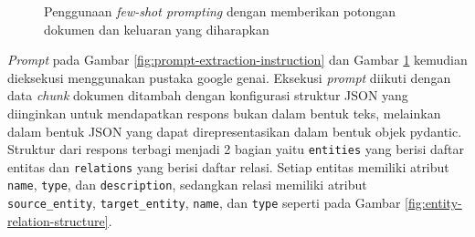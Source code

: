 \begin{figure}[H]
	\centering
	\caption{
		Penggunaan \textit{few-shot prompting} dengan memberikan potongan dokumen dan keluaran yang diharapkan
	}
	\label{fig:prompt-extraction-few-shot}
\end{figure}

\textit{Prompt} pada Gambar \ref{fig:prompt-extraction-instruction} dan Gambar \ref{fig:prompt-extraction-few-shot} kemudian dieksekusi menggunakan pustaka google genai.
Eksekusi \textit{prompt} diikuti dengan data \textit{chunk} dokumen ditambah dengan konfigurasi struktur JSON yang diinginkan untuk mendapatkan respons bukan dalam bentuk teks, melainkan dalam bentuk JSON yang dapat direpresentasikan dalam bentuk objek pydantic.
Struktur dari respons terbagi menjadi 2 bagian yaitu \texttt{entities} yang berisi daftar entitas dan \texttt{relations} yang berisi daftar relasi.
Setiap entitas memiliki atribut \texttt{name}, \texttt{type}, dan \texttt{description}, sedangkan relasi memiliki atribut \\
\texttt{source\_entity}, \texttt{target\_entity}, \texttt{name}, dan \texttt{type} seperti pada Gambar \ref{fig:entity-relation-structure}.

